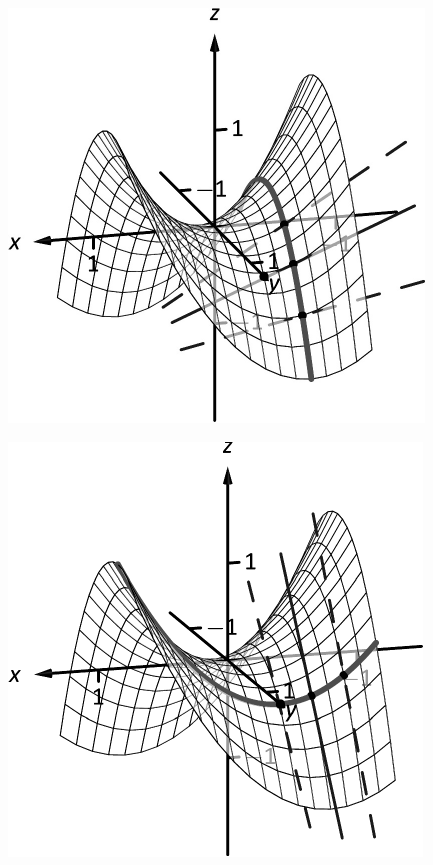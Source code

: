 \documentclass[10pt]{article}
\begin{document}
\includegraphics{figpartial6_3DBW.pdf}
\texttt{}

\includegraphics{figpartial6b_3DBW.pdf}
\texttt{}
\end{document}
